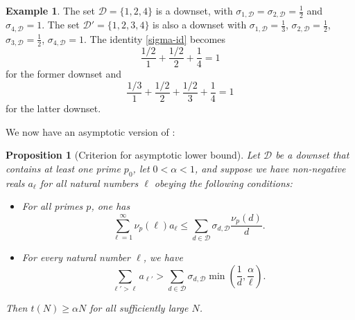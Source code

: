 \documentclass[12pt,a4paper,reqno]{amsart}
\numberwithin{equation}{section}
\theoremstyle{plain}
\newtheorem{proposition}[theorem]{Proposition}
\theoremstyle{definition}
\newtheorem{example}[theorem]{Example}
\begin{document}
\begin{example}  The set ${\mathcal D} = \{1,2,4\}$ is a downset, with $\sigma_{1,{\mathcal D}} = \sigma_{2,{\mathcal D}} = \frac{1}{2}$ and $\sigma_{4,\mathcal D} = 1$.  The set ${\mathcal D}' = \{1,2,3,4\}$ is also a downset with $\sigma_{1,{\mathcal D}} = \frac{1}{3}$, $\sigma_{2,{\mathcal D}} = \frac{1}{2}$, $\sigma_{3,{\mathcal D}} = \frac{1}{2}$, $\sigma_{4,{\mathcal D}} = 1$.  The identity \eqref{sigma-id} becomes
$$ \frac{1/2}{1} + \frac{1/2}{2} + \frac{1}{4} = 1$$
for the former downset and
$$ \frac{1/3}{1} + \frac{1/2}{2} + \frac{1/2}{3} + \frac{1}{4} = 1$$
for the latter downset.
\end{example}

We now have an asymptotic version of :

\begin{proposition}[Criterion for asymptotic lower bound]\label{asym-crit}  Let ${\mathcal D}$ be a downset that contains at least one prime $p_0$, let $0  < \alpha < 1$, and suppose we have non-negative reals $a_\ell$ for all natural numbers $\ell$ obeying the following conditions:
\begin{itemize}
\item[(i)]  For all primes $p$, one has
\begin{equation}\label{i-eq}
   \sum_{\ell=1}^\infty \nu_p(\ell) a_\ell  \leq \sum_{d \in {\mathcal D}} \sigma_{d,{\mathcal D}} \frac{\nu_p(d)}{d}.
\end{equation}
\item[(ii)]  For every natural number $\ell$, we have
\begin{equation}\label{l-eq} \sum_{\ell' > \ell} a_{\ell'} > \sum_{d \in {\mathcal D}} \sigma_{d,{\mathcal D}} \min\left( \frac{1}{d}, \frac{\alpha}{\ell}\right).
\end{equation}
\end{itemize}
Then $t(N) \geq \alpha N$ for all sufficiently large $N$.
\end{proposition}
\end{document}
